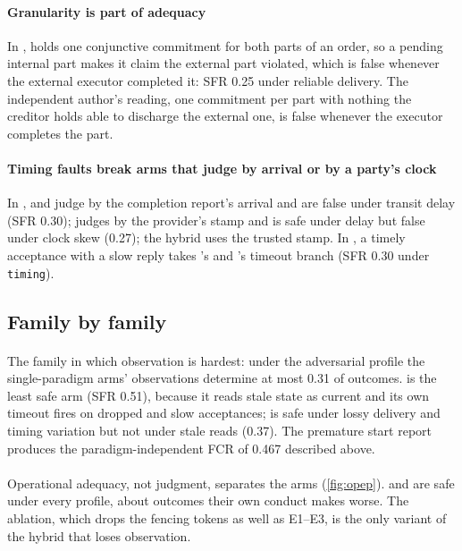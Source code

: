 \paragraph{Granularity is part of adequacy} In ,  holds one conjunctive commitment for both parts of an order, so a pending internal part makes it claim the external part violated, which is false whenever the external executor completed it: SFR 0.25 under reliable delivery. The independent author's reading, one commitment per part with nothing the creditor holds able to discharge the external one, is false whenever the executor completes the part.

\paragraph{Timing faults break arms that judge by arrival or by a party's clock} In ,  and  judge by the completion report's arrival and are false under transit delay (SFR 0.30);  judges by the provider's stamp and is safe under delay but false under clock skew (0.27); the hybrid uses the trusted stamp. In , a timely acceptance with a slow reply takes 's and 's timeout branch (SFR 0.30 under \texttt{timing}).

\subsection{Family by family}

\paragraph{} The family in which observation is hardest: under the adversarial profile the single-paradigm arms' observations determine at most 0.31 of outcomes.  is the least safe arm (SFR 0.51), because it reads stale state as current and its own timeout fires on dropped and slow acceptances;  is safe under lossy delivery and timing variation but not under stale reads (0.37). The premature start report produces the paradigm-independent FCR of 0.467 described above.

\paragraph{} Operational adequacy, not judgment, separates the arms (\cref{fig:opep}).  and  are safe under every profile, about outcomes their own conduct makes worse. The ablation, which drops the fencing tokens as well as E1--E3, is the only variant of the hybrid that loses observation.


